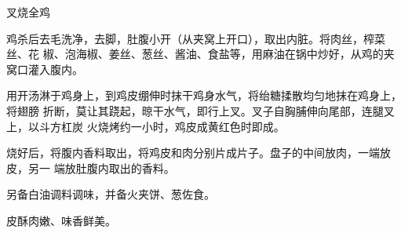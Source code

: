 \begin{recipe}{叉烧全鸡}

\ingredients


\preparation

鸡杀后去毛洗净，去脚，肚腹小开（从夹窝上开口），取出内脏。将肉丝，榨菜丝、花
椒、泡海椒、姜丝、葱丝、酱油、食盐等，用麻油在锅中炒好，从鸡的夹窝口灌入腹内。

用开汤淋于鸡身上，到鸡皮绷伸时抹干鸡身水气，将绐糖揉散均匀地抹在鸡身上，将翅膀
折断，莫让其跷起，晾干水气，即行上叉。叉子自胸脯伸向尾部，连腿叉上，以斗方杠炭
火烧烤约一小时，鸡皮成黄红色时即成。

烧好后，将腹内香料取出，将鸡皮和肉分别片成片子。盘子的中间放肉，一端放皮，另一
端放肚腹内取出的香料。

另备白油调料调味，并备火夹饼、葱佐食。

\features

皮酥肉嫩、味香鲜美。

\end{recipe}

